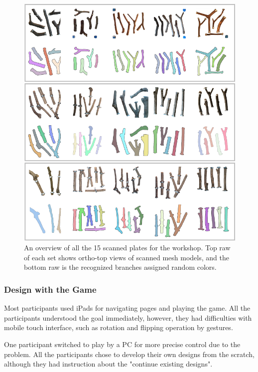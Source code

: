 \begin{figure}[ht]
  \begin{center}
    \includegraphics[width = 0.4\paperwidth]{images/fabrication/all_plates.png}
    \caption{An overview of all the 15 scanned plates for the workshop. Top raw of each set shows ortho-top views of scanned mesh models, and the bottom raw is the recognized branches assigned random colors.}
    \label{fig:scannedplates}
  \end{center}
\end{figure}


\subsubsection*{Design with the Game}
Most participants used iPads for navigating pages and playing the game.
All the participants understood the goal immediately, however, they had difficulties with mobile touch interface, such as rotation and flipping operation by gestures.

One participant switched to play by a PC for more precise control due to the problem.
All the participants chose to develop their own designs from the scratch, although they had instruction about the "continue existing designs".


